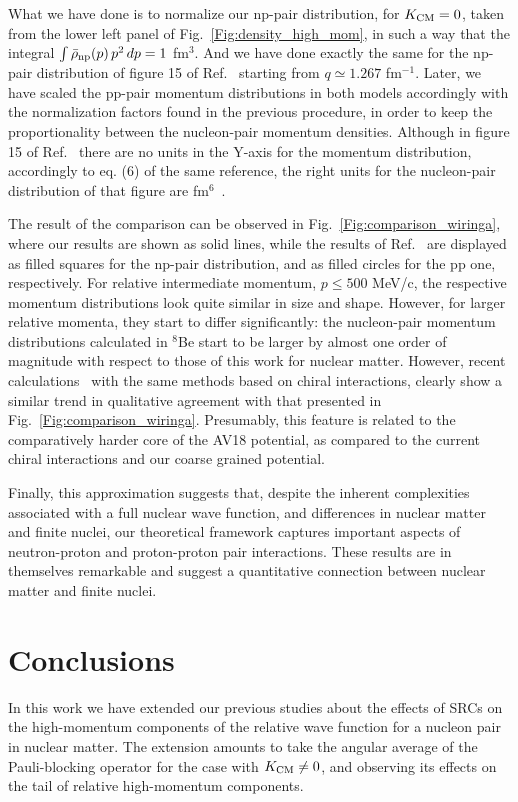 \documentclass[aps,twocolumn,showpacs,preprintnumbers,amsmath,amssymb,nofootinbib,superscriptaddress,showkeys,noeprint]{revtex4-1}
\begin{document}
What we have done is to normalize our np-pair distribution, for
$K_{\rm CM}=0$, taken from the lower left panel of
Fig.~\ref{Fig:density_high_mom}, in such a way that the integral $\int
\bar{\rho}_{\rm np}(p)\,p^2\,dp = 1$ fm${}^3$. And we have done
exactly the same for the np-pair distribution of figure 15 of
Ref.~\cite{Wiringa:2013ala} starting from $q\simeq 1.267$ fm${}^{-1}$.
Later, we have scaled the pp-pair momentum distributions in both
models accordingly with the normalization factors found in the
previous procedure, in order to keep the proportionality between the
nucleon-pair momentum densities. Although in figure 15 of
Ref.~\cite{Wiringa:2013ala} there are no units in the Y-axis for the
momentum distribution, accordingly to eq. (6) of the same reference,
the right units for the nucleon-pair distribution of that figure are
fm$^{6}$~\cite{Wiringa_comm}.

The result of the comparison can be observed in
Fig.~\ref{Fig:comparison_wiringa}, where our results are shown as
solid lines, while the results of Ref.~\cite{Wiringa:2013ala} are
displayed as filled squares for the np-pair distribution, and as
filled circles for the pp one, respectively. For relative intermediate
momentum, $p\le500$ MeV/c, the respective momentum distributions look
quite similar in size and shape.  However, for larger relative
momenta, they start to differ significantly: the nucleon-pair momentum
distributions calculated in ${}^8$Be start to be larger by almost one
order of magnitude with respect to those of this work for nuclear
matter. However, recent calculations~\cite{Piarulli:2022ulk,
  Wiringa_online} with the same methods based on chiral interactions,
clearly show a similar trend in qualitative agreement with that
presented in Fig.~\ref{Fig:comparison_wiringa}.  Presumably, this
feature is related to the comparatively harder core of the AV18
potential, as compared to the current chiral interactions and our
coarse grained potential.

Finally, this approximation suggests that, despite the inherent
complexities associated with a full nuclear wave function, and
differences in nuclear matter and finite nuclei, our theoretical
framework captures important aspects of neutron-proton and
proton-proton pair interactions. These results are in themselves
remarkable and suggest a quantitative connection between nuclear
matter and finite nuclei.


\section{Conclusions}\label{Sec:conclusions}
In this work we have extended our previous studies
\cite{RuizSimo:2016vsh,RuizSimo:2017tcb} about the effects of SRCs on
the high-momentum components of the relative wave function for a
nucleon pair in nuclear matter. The extension amounts to take the
angular average of the Pauli-blocking operator for the case with
$K_{\rm CM}\neq0$, and observing its effects on the tail of relative
high-momentum components.
\end{document}
